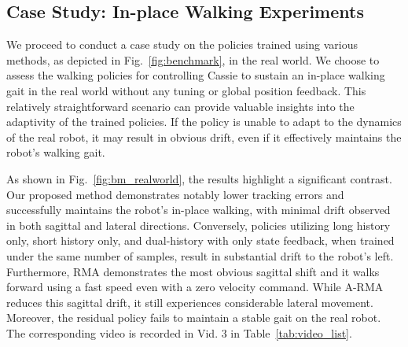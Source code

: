 \subsection{Case Study: In-place Walking Experiments}
We proceed to conduct a case study on the policies trained using various methods, as depicted in Fig.~\ref{fig:benchmark}, in the real world. 
We choose to assess the walking policies for controlling Cassie to sustain an in-place walking gait in the real world without any tuning or global position feedback.
This relatively straightforward scenario can provide valuable insights into the adaptivity of the trained policies. 
If the policy is unable to adapt to the dynamics of the real robot, it may result in obvious drift, even if it effectively maintains the robot's walking gait.

As shown in Fig.~\ref{fig:bm_realworld}, the results highlight a significant contrast.
Our proposed method demonstrates notably lower tracking errors and successfully maintains the robot's in-place walking, with minimal drift observed in both sagittal and lateral directions. 
Conversely, policies utilizing long history only, short history only, and dual-history with only state feedback, when trained under the same number of samples, result in substantial drift to the robot's left.
Furthermore, RMA demonstrates the most obvious sagittal shift and it walks forward using a fast speed even with a zero velocity command. 
While A-RMA reduces this sagittal drift, it still experiences considerable lateral movement. 
Moreover, the residual policy fails to maintain a stable gait on the real robot.
The corresponding video is recorded in Vid. 3 in Table~\ref{tab:video_list}.

